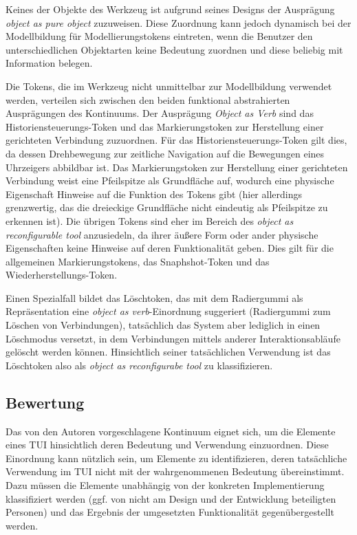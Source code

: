 Keines der Objekte des Werkzeug ist aufgrund seines Designs der Ausprägung \emph{object as pure object} zuzuweisen. Diese Zuordnung kann jedoch dynamisch bei der Modellbildung für Modellierungstokens eintreten, wenn die Benutzer den unterschiedlichen Objektarten keine Bedeutung zuordnen und diese beliebig mit Information belegen. 

Die Tokens, die im Werkzeug nicht unmittelbar zur Modellbildung verwendet werden, verteilen sich zwischen den beiden funktional abstrahierten Ausprägungen des Kontinuums. Der Ausprägung \emph{Object as Verb} sind das Historiensteuerungs-Token und das Markierungstoken zur Herstellung einer gerichteten Verbindung zuzuordnen. Für das Historiensteuerungs-Token gilt dies, da dessen Drehbewegung zur zeitliche Navigation auf die Bewegungen eines Uhrzeigers abbildbar ist. Das Markierungstoken zur Herstellung einer gerichteten Verbindung weist eine Pfeilspitze als Grundfläche auf, wodurch eine physische Eigenschaft Hinweise auf die Funktion des Tokens gibt (hier allerdings grenzwertig, das die dreieckige Grundfläche nicht eindeutig als Pfeilspitze zu erkennen ist). Die übrigen Tokens sind eher im Bereich des \emph{object as reconfigurable tool} anzusiedeln, da ihrer äußere Form oder ander physische Eigenschaften keine Hinweise auf deren Funktionalität geben. Dies gilt für die allgemeinen Markierungstokens, das Snaphshot-Token und das Wieder\-herstellungs-Token. 

Einen Spezialfall bildet das Löschtoken, das mit dem Radiergummi als Repräsentation eine \emph{object as verb}-Einordnung suggeriert (Radiergummi zum Löschen von Verbindungen), tatsächlich das System aber lediglich in einen Löschmodus versetzt, in dem Verbindungen mittels anderer Interaktionsabläufe gelöscht werden können. Hinsichtlich seiner tatsächlichen Verwendung ist das Löschtoken also als \emph{object as reconfigurabe tool} zu klassifizieren.

\subsection{Bewertung} 

Das von den Autoren vorgeschlagene Kontinuum eignet sich, um die Elemente eines \gls{TUI} hinsichtlich deren Bedeutung und Verwendung einzuordnen. Diese Einordnung kann nützlich sein, um Elemente zu identifizieren, deren tatsächliche Verwendung im TUI nicht mit der wahrgenommenen Bedeutung übereinstimmt. Dazu müssen die Elemente unabhängig von der konkreten Implementierung klassifiziert werden (ggf. von nicht am Design und der Entwicklung beteiligten Personen) und das Ergebnis der umgesetzten Funktionalität gegenübergestellt werden.

